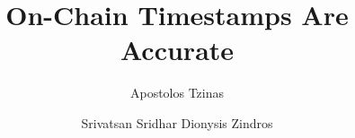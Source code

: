 \title{On-Chain Timestamps Are Accurate}
\ifanonymous{
  \author{}\institute{}
}
\else
\author{
        Apostolos Tzinas \and
        Srivatsan Sridhar 
        Dionysis Zindros \and
}
\fi
